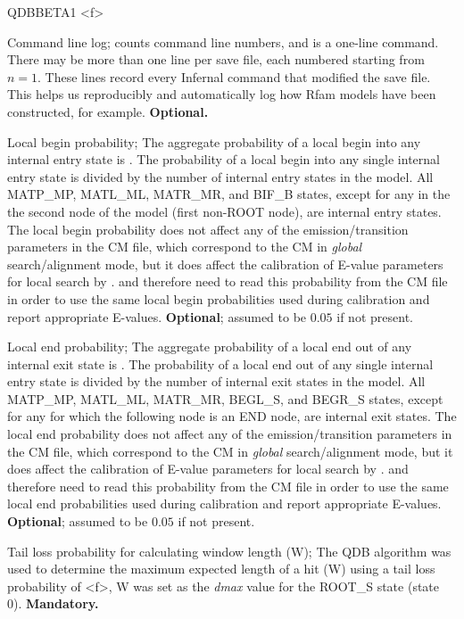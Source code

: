 \begin{sreitems}{QDBBETA1 <f>}
\item [\emprog{COM [<n>] <s>}] Command line log;  counts
command line numbers, and  is a one-line command. There may
be more than one  line per save file, each numbered starting
from $n=1$. These lines record every Infernal command that modified the
save file. This helps us reproducibly and automatically log how Rfam
models have been constructed, for example. \textbf{Optional.}

\item [\emprog{PBEGIN <f>}] Local begin probability; The aggregate
probability of a local begin into any internal entry state is
. The probability of a local begin into any single internal
entry state is  divided by the number of internal entry
states in the model. All MATP\_MP, MATL\_ML, MATR\_MR, and BIF\_B
states, except for any in the the second node of the model (first
non-ROOT node), are internal entry states. The local begin probability
does not affect any of the emission/transition parameters in the CM
file, which correspond to the CM in \emph{global} search/alignment
mode, but it does affect the calibration of E-value parameters for
local search by .  and 
therefore need to read this probability from the CM file in order to
use the same local begin probabilities used during calibration and
report appropriate E-values. \textbf{Optional}; assumed to be $0.05$
if not present.

\item [\emprog{PEND <f>}] Local end probability; The aggregate
probability of a local end out of any internal exit state is
. The probability of a local end out of any single internal
entry state is  divided by the number of internal exit
states in the model. All MATP\_MP, MATL\_ML, MATR\_MR, BEGL\_S, and
BEGR\_S states, except for any for which the following node is an END
node, are internal exit states. The local end probability
does not affect any of the emission/transition parameters in the CM
file, which correspond to the CM in \emph{global} search/alignment
mode, but it does affect the calibration of E-value parameters for
local search by .  and 
therefore need to read this probability from the CM file in order to
use the same local end probabilities used during calibration and
report appropriate E-values. \textbf{Optional}; assumed to be $0.05$
if not present.

\item [\emprog{WBETA <f>}] Tail loss probability for calculating
  window length (W); The QDB algorithm \cite{NawrockiEddy07} was used
  to determine the maximum expected length of a hit (W) using a tail
  loss probability of <f>, W was set as the \emph{dmax} value for the
  ROOT\_S state (state 0). \textbf{Mandatory.}


\end{sreitems}

